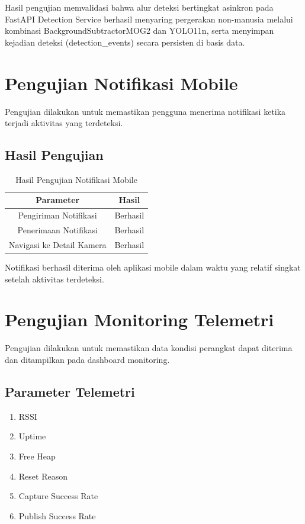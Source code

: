 Hasil pengujian memvalidasi bahwa alur deteksi bertingkat asinkron pada FastAPI Detection Service berhasil menyaring pergerakan non-manusia melalui kombinasi BackgroundSubtractorMOG2 dan YOLO11n, serta menyimpan kejadian deteksi (detection\_events) secara persisten di basis data.

\section{Pengujian Notifikasi Mobile}

Pengujian dilakukan untuk memastikan pengguna menerima notifikasi ketika terjadi aktivitas yang terdeteksi.

\subsection{Hasil Pengujian}

\begin{table}[H]
	\centering
	\caption{Hasil Pengujian Notifikasi Mobile}
	\begin{tabular}{|c|c|}
		\hline
		Parameter & Hasil \\
		\hline
		Pengiriman Notifikasi & Berhasil \\
		Penerimaan Notifikasi & Berhasil \\
		Navigasi ke Detail Kamera & Berhasil \\
		\hline
	\end{tabular}
\end{table}

Notifikasi berhasil diterima oleh aplikasi mobile dalam waktu yang relatif singkat setelah aktivitas terdeteksi.

\section{Pengujian Monitoring Telemetri}

Pengujian dilakukan untuk memastikan data kondisi perangkat dapat diterima dan ditampilkan pada dashboard monitoring.

\subsection{Parameter Telemetri}

\begin{enumerate}
	\item RSSI
	\item Uptime
	\item Free Heap
	\item Reset Reason
	\item Capture Success Rate
	\item Publish Success Rate
\end{enumerate}

